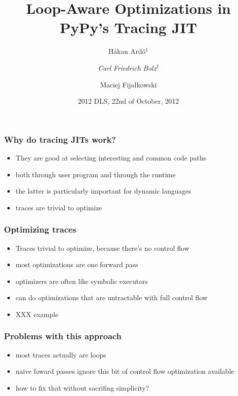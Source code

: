 \documentclass[utf8x]{beamer}
\title{Loop-Aware Optimizations in PyPy’s Tracing JIT}
\author[Ardö, Bolz, Fijałkowski]{Håkan Ardö$^1$ \and \emph{Carl Friedrich Bolz}$^2$ \and Maciej Fijałkowski}
\institute[Lund, Düsseldorf]{
$^1$Centre for Mathematical Sciences, Lund University \and
$^2$Heinrich-Heine-Universität Düsseldorf, STUPS Group, Germany
}
\date{2012 DLS, 22nd of October, 2012}
\begin{document}
\begin{frame}
  \titlepage
\end{frame}

\begin{frame}
  \frametitle{Why do tracing JITs work?}
  \begin{itemize}
      \item They are good at selecting interesting and common code paths
      \item both through user program and through the runtime
      \item the latter is particularly important for dynamic languages
          \pause
      \item traces are trivial to optimize
  \end{itemize}
\end{frame}

\begin{frame}
  \frametitle{Optimizing traces}
  \begin{itemize}
      \item Traces trivial to optimize, because there's no control flow
      \item most optimizations are one forward pass
      \item optimizers are often like symbolic executors
      \item can do optimizations that are untractable with full control flow
      \item XXX example
  \end{itemize}
\end{frame}

\begin{frame}
  \frametitle{Problems with this approach}
  \begin{itemize}
      \item most traces actually are loops
      \item naive foward passes ignore this bit of control flow optimization available
      \item how to fix that without sacrifing simplicity?
  \end{itemize}
\end{frame}
\end{document}
